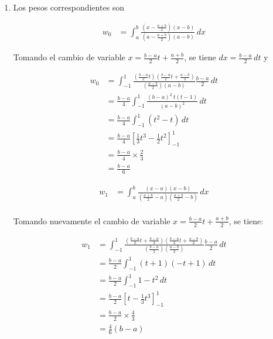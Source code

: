 \begin{problema}\leavevmode
\begin{enumerate}[label=\textbf{\alph*)}]
\item Los pesos correspondientes son

\begin{align*}
w_0 &= \int_{a}^{b} \frac{\left(x - \frac{a+b}{2}\right)(x - b)}{\left(a - \frac{a+b}{2}\right)(a - b)} \, dx
\end{align*}

Tomando el cambio de variable \( x = \frac{b-a}{2}t + \frac{a+b}{2} \), se tiene \( dx = \frac{b-a}{2} \, dt \) y

\begin{align*}
w_0 &= \int_{-1}^{1} \frac{\left(\frac{b-a}{2}t\right) \left(\frac{b-a}{2}t + \frac{a-b}{2}\right)}{\left(\frac{a-b}{2}\right)(a-b)} \frac{b-a}{2} \, dt \\[1em]
&= \frac{b-a}{4} \int_{-1}^{1} \frac{(b-a)^2\ t(t-1)}{(a-b)^2} \, dt \\[1em]
&= \frac{b-a}{4} \int_{-1}^{1} (t^2 - t) \, dt \\[1em]
&= \frac{b-a}{4} \left[ \frac{1}{3}t^3 - \frac{1}{2}t^2 \right]_{-1}^{1} \\[1em]
&= \frac{b-a}{4} \times \frac{2}{3} \\[1em]
&= \frac{b-a}{6}
\end{align*}


\begin{align*}
w_1 &= \int_{a}^{b} \frac{(x - a)(x - b)}{\left(\frac{a+b}{2} - a\right)\left(\frac{a+b}{2} - b\right)} \, dx \\[1em]
\end{align*}

Tomando nuevamente el cambio de variable \( x = \frac{b-a}{2}t + \frac{a+b}{2} \), se tiene:

\begin{align*}
w_1 &= \int_{-1}^{1} \frac{\left( \frac{b-a}{2}t + \frac{b-a}{2} \right) \left( \frac{b-a}{2}t + \frac{a-b}{2} \right)}{\left( \frac{b-a}{2} \right) \left( \frac{a-b}{2} \right)} \frac{b-a}{2} \, dt \\[1em]
&= \frac{b-a}{2} \int_{-1}^{1} (t + 1)(-t + 1) \, dt \\[1em]
&= \frac{b-a}{2} \int_{-1}^{1} 1 - t^2 \, dt \\[1em]
&= \frac{b-a}{2} \left[ t - \frac{1}{3}t^3 \right]_{-1}^{1} \\[1em]
&= \frac{b-a}{2} \times \frac{4}{3} \\[1em]
&= \frac{4}{6}(b - a)
\end{align*}


\end{enumerate}
\end{problema}
